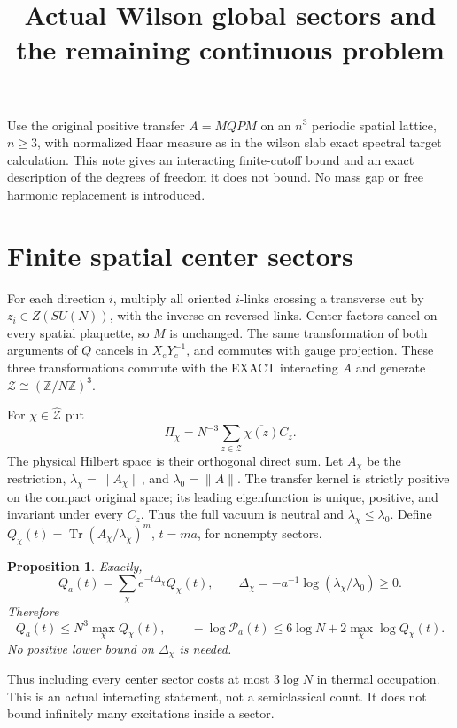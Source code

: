 \documentclass{article}
\title{Actual Wilson global sectors and the remaining continuous problem}\author{}\date{}
\newtheorem{proposition}{Proposition}
\begin{document}
\maketitle
Use the original positive transfer $A=M Q P M$ on an $n^3$ periodic spatial lattice, $n\ge3$, with normalized Haar measure as in the wilson slab exact spectral target calculation. This note gives an interacting finite-cutoff bound and an exact description of the degrees of freedom it does not bound. No mass gap or free harmonic replacement is introduced.

\section*{Finite spatial center sectors}
For each direction $i$, multiply all oriented $i$-links crossing a transverse cut by $z_i\in Z(SU(N))$, with the inverse on reversed links. Center factors cancel on every spatial plaquette, so $M$ is unchanged. The same transformation of both arguments of $Q$ cancels in $X_eY_e^{-1}$, and commutes with gauge projection. These three transformations commute with the EXACT interacting $A$ and generate $\mathcal Z\cong(\mathbb Z/N\mathbb Z)^3$.

For $\chi\in\widehat{\mathcal Z}$ put
\[
 \Pi_\chi=N^{-3}\sum_{z\in\mathcal Z}\overline{\chi(z)}C_z.
\]
The physical Hilbert space is their orthogonal direct sum. Let $A_\chi$ be the restriction, $\lambda_\chi=\|A_\chi\|$, and $\lambda_0=\|A\|$. The transfer kernel is strictly positive on the compact original space; its leading eigenfunction is unique, positive, and invariant under every $C_z$. Thus the full vacuum is neutral and $\lambda_\chi\le\lambda_0$. Define $Q_\chi(t)=\operatorname{Tr}(A_\chi/\lambda_\chi)^m$, $t=ma$, for nonempty sectors.

\begin{proposition}
Exactly,
\[
 Q_a(t)=\sum_\chi e^{-t\Delta_\chi}Q_\chi(t),\qquad
 \Delta_\chi=-a^{-1}\log(\lambda_\chi/\lambda_0)\ge0.
\]
Therefore
\[
 Q_a(t)\le N^3\max_\chi Q_\chi(t),\qquad
 -\log\mathcal P_a(t)\le6\log N+2\max_\chi\log Q_\chi(t).
\]
No positive lower bound on $\Delta_\chi$ is needed.
\end{proposition}
Thus including every center sector costs at most $3\log N$ in thermal occupation. This is an actual interacting statement, not a semiclassical count. It does not bound infinitely many excitations inside a sector.
\end{document}
